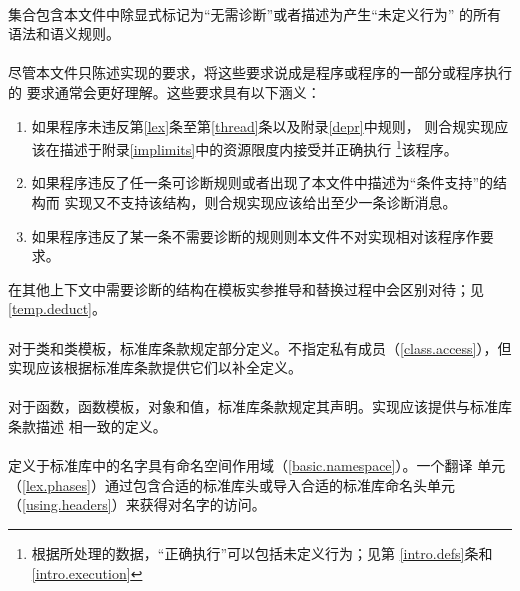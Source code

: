 \paragraph{} %
集合包含本文件中除显式标记为“无需诊断”或者描述为产生“未定义行为”
的所有语法和语义规则。

\paragraph{} %
尽管本文件只陈述\cpp{}实现的要求，将这些要求说成是程序或程序的一部分或程序执行的
要求通常会更好理解。这些要求具有以下涵义：
\begin{enumerate}
  \item 如果程序未违反第\ref{lex}条至第\ref{thread}条以及附录\ref{depr}中规则，
        则合规实现应该在描述于附录\ref{implimits}中的资源限度内接受并正确执行
        \footnote{根据所处理的数据，“正确执行”可以包括未定义行为；见第
        \ref{intro.defs}条和\ref{intro.execution}}该程序。
  \item 如果程序违反了任一条可诊断规则或者出现了本文件中描述为“条件支持”的结构而
        实现又不支持该结构，则合规实现应该给出至少一条诊断消息。
  \item 如果程序违反了某一条不需要诊断的规则则本文件不对实现相对该程序作要求。
\end{enumerate}
\begin{note}
在其他上下文中需要诊断的结构在模板实参推导和替换过程中会区别对待；见
\ref{temp.deduct}。
\end{note}

\paragraph{} %
对于类和类模板，标准库条款规定部分定义。不指定私有成员（\ref{class.access}），但
实现应该根据标准库条款提供它们以补全定义。

\paragraph{} %
对于函数，函数模板，对象和值，标准库条款规定其声明。实现应该提供与标准库条款描述
相一致的定义。

\paragraph{} %
定义于标准库中的名字具有命名空间作用域（\ref{basic.namespace}）。一个\cpp{}翻译
单元（\ref{lex.phases}）通过包含合适的标准库头或导入合适的标准库命名头单元
（\ref{using.headers}）来获得对名字的访问。

